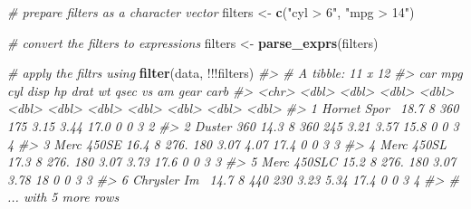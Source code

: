 \documentclass[]{book}
\newenvironment{Shaded}{}{}
\newcommand{\CommentTok}[1]{\textcolor[rgb]{0.38,0.63,0.69}{\textit{#1}}}
\newcommand{\KeywordTok}[1]{\textcolor[rgb]{0.00,0.44,0.13}{\textbf{#1}}}
\newcommand{\NormalTok}[1]{#1}
\newcommand{\OperatorTok}[1]{\textcolor[rgb]{0.40,0.40,0.40}{#1}}
\newcommand{\StringTok}[1]{\textcolor[rgb]{0.25,0.44,0.63}{#1}}
\begin{document}
\begin{Shaded}
\begin{Highlighting}[]
\CommentTok{# prepare filters as a character vector}
\NormalTok{filters <-}\StringTok{ }\KeywordTok{c}\NormalTok{(}\StringTok{"cyl > 6"}\NormalTok{, }\StringTok{"mpg > 14"}\NormalTok{)}

\CommentTok{# convert the filters to expressions}
\NormalTok{filters <-}\StringTok{ }\KeywordTok{parse_exprs}\NormalTok{(filters)}

\CommentTok{# apply the filtrs using}
\KeywordTok{filter}\NormalTok{(data, }\OperatorTok{!!!}\NormalTok{filters)}
\CommentTok{#> # A tibble: 11 x 12}
\CommentTok{#>   car            mpg   cyl  disp    hp  drat    wt  qsec    vs    am  gear  carb}
\CommentTok{#>   <chr>        <dbl> <dbl> <dbl> <dbl> <dbl> <dbl> <dbl> <dbl> <dbl> <dbl> <dbl>}
\CommentTok{#> 1 Hornet Spor~  18.7     8  360    175  3.15  3.44  17.0     0     0     3     2}
\CommentTok{#> 2 Duster 360    14.3     8  360    245  3.21  3.57  15.8     0     0     3     4}
\CommentTok{#> 3 Merc 450SE    16.4     8  276.   180  3.07  4.07  17.4     0     0     3     3}
\CommentTok{#> 4 Merc 450SL    17.3     8  276.   180  3.07  3.73  17.6     0     0     3     3}
\CommentTok{#> 5 Merc 450SLC   15.2     8  276.   180  3.07  3.78  18       0     0     3     3}
\CommentTok{#> 6 Chrysler Im~  14.7     8  440    230  3.23  5.34  17.4     0     0     3     4}
\CommentTok{#> # ... with 5 more rows}
\end{Highlighting}
\end{Shaded}
\end{document}
